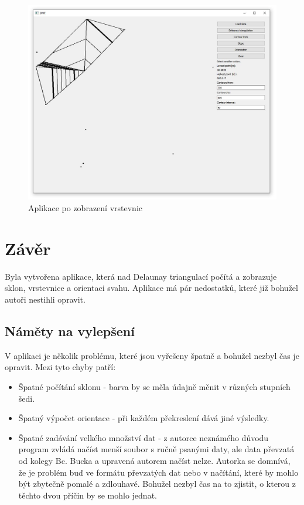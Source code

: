 \documentclass{article}
\begin{document}
\begin{figure}[htbp]
\centering
        \includegraphics[trim=0cm 0cm 0cm 0cm, width=1\textwidth]{contours.jpg}
        \caption{Aplikace po zobrazení vrstevnic}
\end{figure}

\section{Závěr}
Byla vytvořena aplikace, která nad Delaunay triangulací počítá a zobrazuje sklon, vrstevnice a orientaci svahu. Aplikace má pár nedostatků, které již bohužel autoři nestihli opravit.
	\subsection{Náměty na vylepšení} %
	V aplikaci je několik problému, které jsou vyřešeny špatně a bohužel nezbyl čas je opravit. Mezi tyto chyby patří: 
	\begin{itemize}
	\item Špatné počítání sklonu - barva by se měla údajně měnit v různých stupních šedi.
	\item Špatný výpočet orientace - při každém překreslení dává jiné výsledky.
	\item Špatné zadávání velkého množství dat - z autorce neznámého důvodu program zvládá načíst menší soubor s ručně psanými daty, ale data převzatá od kolegy Bc. Bucka a upravená autorem načíst nelze. Autorka se domnívá, že je problém buď ve formátu převzatých dat nebo v načítání, které by mohlo být zbytečně pomalé a zdlouhavé. Bohužel nezbyl čas na to zjistit, o kterou z těchto dvou příčin by se mohlo jednat. 
	\end{itemize}
	

\clearpage

\end{document}
